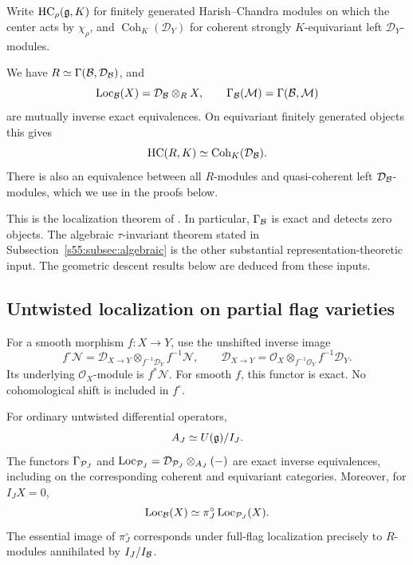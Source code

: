 Write $\operatorname{HC}_\rho(\mathfrak{g},K)$ for finitely generated
Harish--Chandra modules on which the center acts by $\chi_\rho$, and
$\operatorname{Coh}_K(\mathcal D_Y)$ for coherent strongly $K$-equivariant
left $\mathcal D_Y$-modules.

\begin{thm}
\label{s55:thm:BB}
We have $R\simeq\Gamma(\mathcal{B},\mathcal D_{\mathcal{B}})$, and
\[
 \operatorname{Loc}_{\mathcal{B}}(X)
   =\mathcal D_{\mathcal{B}}\otimes_R X,
 \qquad
 \Gamma_{\mathcal{B}}(\mathcal M)=\Gamma(\mathcal{B},\mathcal M)
\]
are mutually inverse exact equivalences. On equivariant finitely generated
objects this gives
\[
 \operatorname{HC}(R,K)
   \simeq \operatorname{Coh}_K(\mathcal D_{\mathcal{B}}).
\]
There is also an equivalence between all $R$-modules and quasi-coherent
left $\mathcal D_{\mathcal{B}}$-modules, which we use in the proofs below.
\end{thm}

This is the localization theorem of \cite{BB81}. In particular,
$\Gamma_{\mathcal{B}}$ is exact and detects zero objects. The algebraic
$\tau$-invariant theorem stated in Subsection~\ref{s55:subsec:algebraic} is the other substantial
representation-theoretic input. The geometric descent results below are
deduced from these inputs.

\subsection{Untwisted localization on partial flag varieties}

For a smooth morphism $f:X\to Y$, use the unshifted inverse image
\[
 f^\circ\mathcal N
 =\mathcal D_{X\to Y}\otimes_{f^{-1}\mathcal D_Y}f^{-1}\mathcal N,
 \qquad
 \mathcal D_{X\to Y}
 =\mathcal O_X\otimes_{f^{-1}\mathcal O_Y}f^{-1}\mathcal D_Y.
\]
Its underlying $\mathcal O_X$-module is $f^*\mathcal N$. For smooth $f$,
this functor is exact. No cohomological shift is included in $f^\circ$.

\begin{prop}
\label{s55:prop:partial}
For ordinary untwisted differential operators,
\[
  A_J\simeq U(\mathfrak{g})/I_J.
\]
The functors $\Gamma_{\mathcal{P}_J}$ and
$\operatorname{Loc}_{\mathcal{P}_J}=\mathcal D_{\mathcal{P}_J}\otimes_{A_J}(-)$
are exact inverse equivalences, including on the corresponding coherent
and equivariant categories. Moreover, for $I_JX=0$,
\begin{equation}
\label{s55:eq:compat}
  \operatorname{Loc}_{\mathcal{B}}(X)
  \simeq \pi_J^\circ\operatorname{Loc}_{\mathcal{P}_J}(X).
\end{equation}
The essential image of $\pi_J^\circ$ corresponds under full-flag
localization precisely to $R$-modules annihilated by $I_J/I_{\mathcal{B}}$.
\end{prop}

